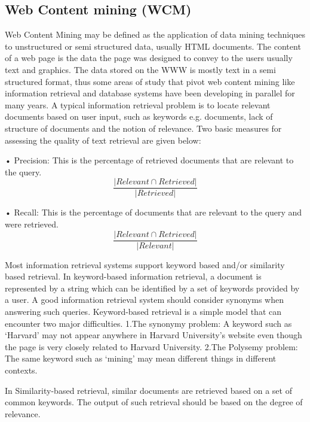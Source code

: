 \documentclass{article}
\begin{document}
\pagebreak
\subsection{Web Content mining (WCM) }
Web Content Mining may be defined as the application of data mining techniques to unstructured or semi structured data, usually HTML documents. The content of a web page is the data the page was designed to convey to the users usually text and graphics. The data stored on the WWW is mostly text in a semi structured format, thus some areas of study that pivot web content mining like information retrieval and database systems have been developing in parallel for many years. A typical information retrieval problem is to locate relevant documents based on user input, such as keywords e.g. documents,  lack of structure of documents  and the notion of relevance.
Two basic measures for assessing the quality of text retrieval are given below:

•	Precision: This is the percentage of retrieved documents that are relevant to the query.\begin{equation}
\frac{|{Relevant}\cap{Retrieved}|}{|Retrieved|}\end{equation}
  
           
•	Recall: This is the percentage of documents that are relevant to the query and were retrieved. \begin{equation}
\frac{|{Relevant}\cap{Retrieved}|}{|Relevant|}\end{equation}  
           
Most information retrieval systems support keyword based and/or similarity based retrieval. In keyword-based information retrieval, a document is represented by a string which can be identified by a set of keywords provided by a user. A good information retrieval system should consider synonyms when answering such queries. Keyword-based retrieval is a simple model that can encounter two major difficulties.\newline
1.The synonymy problem: A keyword such as ‘Harvard’ may not appear anywhere in  Harvard University’s website even though the page is very closely related to Harvard University. \newline
2.The Polysemy problem: The same keyword such as ‘mining’ may mean different things in different contexts.

In Similarity-based retrieval, similar documents are retrieved based on a set of common keywords. The output of such retrieval should be based on the degree of relevance.
\end{document}
